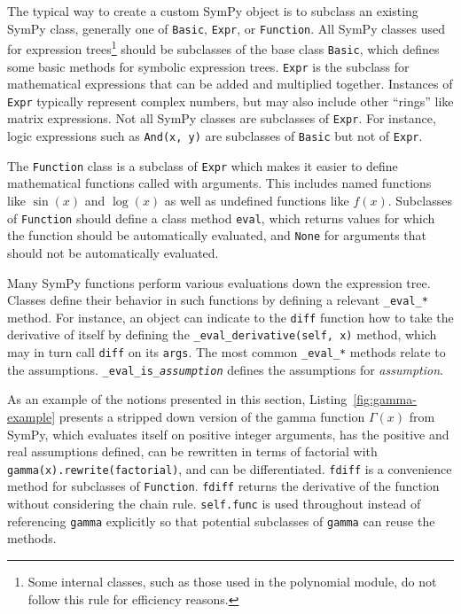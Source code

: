 The typical way to create a custom SymPy object is to subclass an existing
SymPy class, generally one of \texttt{Basic}, \texttt{Expr}, or
\texttt{Function}. All SymPy classes used for expression trees\footnote{Some
  internal classes, such as those used in the polynomial module, do not follow
  this rule for efficiency reasons.} should be subclasses of the base class
\texttt{Basic}, which defines some basic methods for symbolic expression
trees. \texttt{Expr} is the subclass for mathematical expressions that can be
added and multiplied together. Instances of \texttt{Expr} typically represent
complex numbers, but may also include other ``rings'' like matrix expressions.
Not all SymPy classes are subclasses of \texttt{Expr}. For instance, logic expressions such
as \verb|And(x, y)| are subclasses of \texttt{Basic} but not of \texttt{Expr}.

The \texttt{Function} class is a subclass of \texttt{Expr} which makes it
easier to define mathematical functions called with arguments. This includes
named functions like $\sin(x)$ and $\log(x)$ as well as undefined functions
like $f(x)$. Subclasses of \texttt{Function} should define a
class method \texttt{eval}, which returns values for which the function should
be automatically evaluated, and \texttt{None} for arguments that should not be
automatically evaluated.

Many SymPy functions perform various evaluations down the expression tree.
Classes define their behavior in such functions by defining a relevant
\verb|_eval_|\texttt{\textit{*}} method. For instance, an object can indicate
to the \texttt{diff} function how to take the derivative of itself by defining
the \verb|_eval_derivative(self, x)| method, which may in turn call
\texttt{diff} on its \texttt{args}. The most common
\verb|_eval_|\texttt{\textit{*}} methods relate to the assumptions.
\verb|_eval_is_|\texttt{\textit{assumption}} defines the assumptions for
\textit{assumption}.

As an example of the notions presented in this section,
Listing~\ref{fig:gamma-example} presents a stripped down version of the gamma
function $\Gamma(x)$ from SymPy, which evaluates itself on positive integer
arguments, has the positive and real assumptions defined, can be rewritten in
terms of factorial with \verb|gamma(x).rewrite(factorial)|, and can be
differentiated. \texttt{fdiff} is a convenience method for subclasses of
\texttt{Function}. \texttt{fdiff} returns the derivative of the function
without considering the chain rule. \texttt{self.func} is used throughout
instead of referencing \texttt{gamma} explicitly so that potential subclasses
of \texttt{gamma} can reuse the methods.

